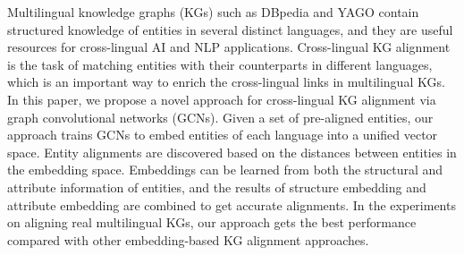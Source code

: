 Multilingual knowledge graphs (KGs) such as DBpedia and YAGO contain structured knowledge of entities in several distinct languages, and they are useful resources for cross-lingual AI and NLP applications. Cross-lingual KG alignment is the task of matching entities with their counterparts in different languages, which is an important way to enrich the cross-lingual links in multilingual KGs. In this paper, we propose a novel approach for cross-lingual KG alignment via graph convolutional networks (GCNs). Given a set of pre-aligned entities, our approach trains GCNs to embed entities of each language into a unified vector space. Entity alignments are discovered based on the distances between entities in the embedding space. Embeddings can be learned from both the structural and attribute information of entities, and the results of structure embedding and attribute embedding are combined to get accurate alignments. In the experiments on aligning real multilingual KGs, our approach gets the best performance compared with other embedding-based KG alignment approaches.
